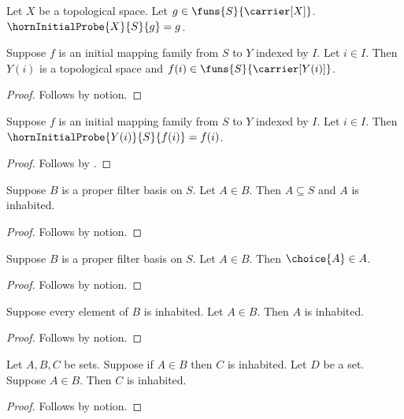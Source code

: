



\begin{definition}\label{horn_initial_probe}
    Let $X$ be a topological space.
    Let $g\in\funs{S}{\carrier[X]}$.
    $\hornInitialProbe{X}{S}{g}=g$.
\end{definition}

\begin{proposition}\label{horn_initial_pointwise}
    Suppose $f$ is an initial mapping family from $S$ to $Y$ indexed by $I$.
    Let $i\in I$.
    Then $Y(i)$ is a topological space and
        $f(i)\in\funs{S}{\carrier[Y(i)]}$.
\end{proposition}
\begin{proof}
    Follows by notion.
\end{proof}

\begin{proposition}\label{horn_initial_source_call}
    Suppose $f$ is an initial mapping family from $S$ to $Y$ indexed by $I$.
    Let $i\in I$.
    Then $\hornInitialProbe{Y(i)}{S}{f(i)}=f(i)$.
\end{proposition}
\begin{proof}
    Follows by .
\end{proof}

\begin{proposition}\label{horn_proper_basis_member}
    Suppose $B$ is a proper filter basis on $S$.
    Let $A\in B$.
    Then $A\subseteq S$ and $A$ is inhabited.
\end{proposition}
\begin{proof}
    Follows by notion.
\end{proof}

\begin{proposition}\label{horn_proper_basis_choice}
    Suppose $B$ is a proper filter basis on $S$.
    Let $A\in B$.
    Then $\choice{A}\in A$.
\end{proposition}
\begin{proof}
    Follows by notion.
\end{proof}

\begin{proposition}\label{horn_local_inhabited_member}
    Suppose every element of $B$ is inhabited.
    Let $A\in B$.
    Then $A$ is inhabited.
\end{proposition}
\begin{proof}
    Follows by notion.
\end{proof}

\begin{proposition}\label{horn_local_whole_implication}
    Let $A,B,C$ be sets.
    Suppose if $A\in B$ then $C$ is inhabited.
    Let $D$ be a set.
    Suppose $A\in B$.
    Then $C$ is inhabited.
\end{proposition}
\begin{proof}
    Follows by notion.
\end{proof}
